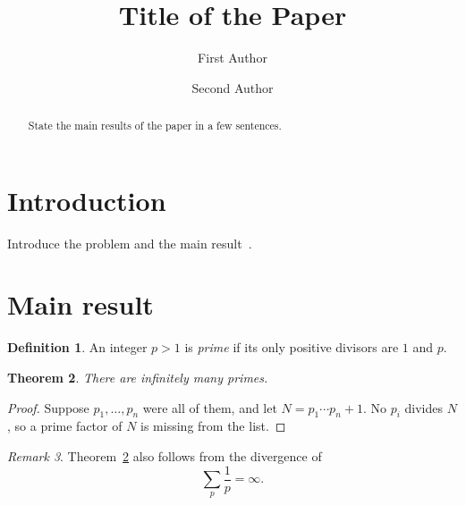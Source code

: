 \documentclass{amsproc}
\newtheorem{theorem}{Theorem}[section]
\theoremstyle{definition}
\newtheorem{definition}[theorem]{Definition}
\theoremstyle{remark}
\newtheorem{remark}[theorem]{Remark}
\numberwithin{equation}{section}
\begin{document}
\title{Title of the Paper}

\author{First Author}
\address{Department of Mathematics, University, City, Country}

\author{Second Author}
\address{Institute, City, Country}


\begin{abstract}
State the main results of the paper in a few sentences.
\end{abstract}

\maketitle

\section{Introduction}
Introduce the problem and the main result~\cite{hardy2008introduction}.

\section{Main result}
\begin{definition}
An integer $p > 1$ is \emph{prime} if its only positive divisors are $1$ and $p$.
\end{definition}

\begin{theorem}\label{thm:main}
There are infinitely many primes.
\end{theorem}

\begin{proof}
Suppose $p_1, \dots, p_n$ were all of them, and let $N = p_1 \cdots p_n + 1$.
No $p_i$ divides $N$, so a prime factor of $N$ is missing from the list.
\end{proof}

\begin{remark}
Theorem~\ref{thm:main} also follows from the divergence of
\begin{equation}\label{eq:sum}
  \sum_{p} \frac{1}{p} = \infty .
\end{equation}
\end{remark}



\end{document}
